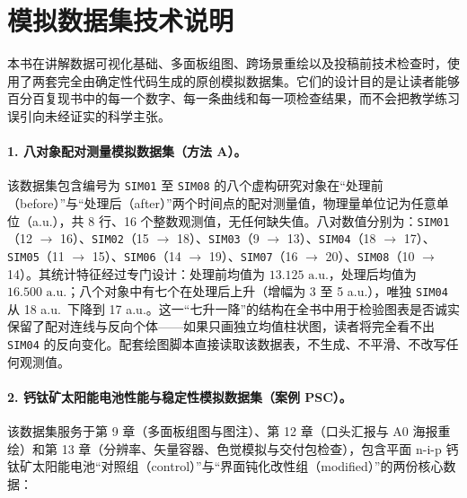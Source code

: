 \section{模拟数据集技术说明}

本书在讲解数据可视化基础、多面板组图、跨场景重绘以及投稿前技术检查时，使用了两套完全由确定性代码生成的原创模拟数据集。它们的设计目的是让读者能够百分百复现书中的每一个数字、每一条曲线和每一项检查结果，而不会把教学练习误引向未经证实的科学主张。

\paragraph{1. 八对象配对测量模拟数据集（方法 A）。}
该数据集包含编号为 \texttt{SIM01} 至 \texttt{SIM08} 的八个虚构研究对象在“处理前（before）”与“处理后（after）”两个时间点的配对测量值，物理量单位记为任意单位（a.u.），共 8 行、16 个整数观测值，无任何缺失值。八对数值分别为：\texttt{SIM01}（12 $\rightarrow$ 16）、\texttt{SIM02}（15 $\rightarrow$ 18）、\texttt{SIM03}（9 $\rightarrow$ 13）、\texttt{SIM04}（18 $\rightarrow$ 17）、\texttt{SIM05}（11 $\rightarrow$ 15）、\texttt{SIM06}（14 $\rightarrow$ 19）、\texttt{SIM07}（16 $\rightarrow$ 20）、\texttt{SIM08}（10 $\rightarrow$ 14）。其统计特征经过专门设计：处理前均值为 $13.125\text{ a.u.}$，处理后均值为 $16.500\text{ a.u.}$；八个对象中有七个在处理后上升（增幅为 3 至 5 a.u.），唯独 \texttt{SIM04} 从 18 a.u.\ 下降到 17 a.u.。这一“七升一降”的结构在全书中用于检验图表是否诚实保留了配对连线与反向个体——如果只画独立均值柱状图，读者将完全看不出 \texttt{SIM04} 的反向变化。配套绘图脚本直接读取该数据表，不生成、不平滑、不改写任何观测值。

\paragraph{2. 钙钛矿太阳能电池性能与稳定性模拟数据集（案例 PSC）。}
该数据集服务于第 9 章（多面板组图与图注）、第 12 章（口头汇报与 A0 海报重绘）和第 13 章（分辨率、矢量容器、色觉模拟与交付包检查），包含平面 n-i-p 钙钛矿太阳能电池“对照组（control）”与“界面钝化改性组（modified）”的两份核心数据：

